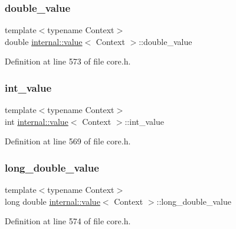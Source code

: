\subsubsection{\texorpdfstring{double\+\_\+value}{double\_value}}
{\footnotesize\ttfamily template$<$typename Context$>$ \\
double \hyperlink{classinternal_1_1value}{internal\+::value}$<$ Context $>$\+::double\+\_\+value}



Definition at line 573 of file core.\+h.

\mbox{\label{classinternal_1_1value_a8e2b73ad5a9319e0b93bdb68467ba0b3}} 
\subsubsection{\texorpdfstring{int\+\_\+value}{int\_value}}
{\footnotesize\ttfamily template$<$typename Context$>$ \\
int \hyperlink{classinternal_1_1value}{internal\+::value}$<$ Context $>$\+::int\+\_\+value}



Definition at line 569 of file core.\+h.

\mbox{\label{classinternal_1_1value_a39ac0e75a8a16f2d50a032b242af7a54}} 
\subsubsection{\texorpdfstring{long\+\_\+double\+\_\+value}{long\_double\_value}}
{\footnotesize\ttfamily template$<$typename Context$>$ \\
long double \hyperlink{classinternal_1_1value}{internal\+::value}$<$ Context $>$\+::long\+\_\+double\+\_\+value}



Definition at line 574 of file core.\+h.

\mbox{\label{classinternal_1_1value_acac03c081ac2c8ab67f542f55e935789}} 
